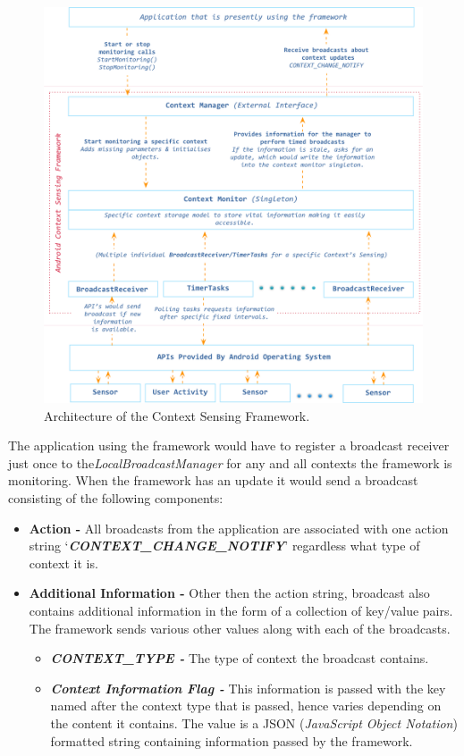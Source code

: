 \documentclass[12pt]{report}
\begin{document}
\begin{figure}[hbtp]
 \centering
 \includegraphics[width=150mm]{FrameworkArch.png}
  \caption[Architecture of the Context Sensing Framework.]{Architecture of the Context Sensing Framework.}
 \label{figure:FrameworkArchModel}
\end{figure}

The application using the framework would have to register a broadcast receiver just once to the\textit{LocalBroadcastManager} for any and all contexts the framework is monitoring. When the framework has an update it would send a broadcast consisting of the following components:

\begin{itemize}
\item \textbf{Action - } All broadcasts from the application are associated with one action string `\textit{\textbf{CONTEXT\_CHANGE\_NOTIFY}}' regardless what type of context it is.

\item \textbf{Additional Information - } Other then the action string, broadcast also contains additional information in the form of a collection of key/value pairs. The framework sends various other values along with each of the broadcasts.
    \begin{itemize}
    \item \textit{\textbf{CONTEXT\_TYPE - }}The type of context the broadcast contains.
    \item \textit{\textbf{Context Information Flag - }}This information is passed with the key named after the context type that is passed, hence varies depending on the content it contains. The value is a JSON (\textit{JavaScript Object Notation}) formatted string containing information passed by the framework.
    \end{itemize}
\end{itemize}
\end{document}
